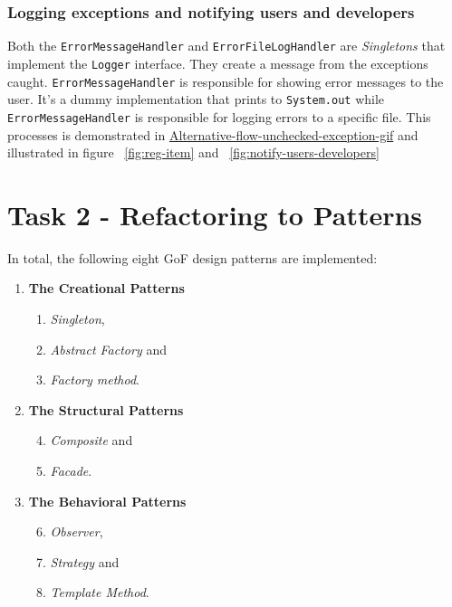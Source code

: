 \documentclass[a4paper]{scrreprt}
\begin{document}
\subsubsection{Logging exceptions and notifying users and developers}
Both the \texttt{ErrorMessageHandler} and \texttt{ErrorFileLogHandler}
are \emph{Singletons} that implement the \texttt{Logger} interface.
They create a message from the exceptions
caught.
\texttt{ErrorMessageHandler}
is responsible for showing error messages to the user.
It's a dummy implementation that prints to
\texttt{System.out} while
\texttt{ErrorMessageHandler}
is responsible for logging errors to a specific file.
This processes is demonstrated in
\href{https://github.com/VincentFerrigan/kth-iv1350-object-oriented-design#alternative-flow---unchecked-exception}{Alternative-flow-unchecked-exception-gif}
and illustrated in
figure ~\ref{fig:reg-item} and ~\ref{fig:notify-users-developers}

\newpage
\section*{Task 2 - Refactoring to Patterns}
In total, the following eight GoF design patterns are implemented:
\begin{enumerate}
    \item \textbf{The Creational Patterns}
    \begin{enumerate}
        \item \emph{Singleton},
        \item \emph{Abstract Factory} and
        \item \emph{Factory method}.
    \end{enumerate}
    \item \textbf{The Structural Patterns}
    \begin{enumerate}
        \setcounter{enumi}{3}
        \item \emph{Composite} and
        \item \emph{Facade}.
    \end{enumerate}
    \item \textbf{The Behavioral Patterns}
    \begin{enumerate}
        \setcounter{enumi}{5}
        \item \emph{Observer},
        \item \emph{Strategy} and
        \item \emph{Template Method}.
    \end{enumerate}
\end{enumerate}
\end{document}
